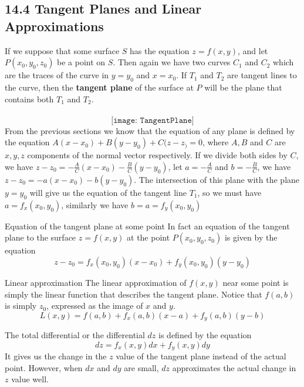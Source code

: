 \documentclass{article}
\begin{document}
	\subsection{14.4 Tangent Planes and Linear Approximations}
	If we suppose that some surface $S$ has the equation $z=f(x,y)$, and let $P(x_{0}
	,y_{0},z_{0})$ be a point on $S$. Then again we have two curves $C_{1}$ and
	$C_{2}$ which are the traces of the curve in $y=y_{0}$ and $x=x_{0}$. If $T_{1}$
	and $T_{2}$ are tangent lines to the curve, then the \textbf{tangent plane} of
	the surface at $P$ will be the plane that contains both $T_{1}$ and $T_{2}$.\\\\

	\[
		\texttt{[image: TangentPlane]}
	\]
	From the previous sections we know that the equation of any plane is defined by
	the equation $A(x-x_{0})+B(y-y_{0})+C(z-z_{)} = 0$, where $A,B$ and $C$ are
	$x,y,z$ components of the normal vector respectively. If we divide both sides by
	$C$, we have $z-z_{0} = -\frac{A}{C}(x-x_{0})-\frac{B}{C}(y-y_{0})$, let $a=-\frac{A}{C}$
	and $b= -\frac{B}{C}$, we have $z-z_{0} = -a(x-x_{0})-b(y-y_{0})$. The intersection
	of this plane with the plane $y=y_{0}$ will give us the equation of the tangent
	line $T_{1}$, so we must have $a=f_{x}(x_{0},y_{0})$, similarly we have $b=a=f_{y}
	(x_{0},y_{0})$
	\begin{mybox}
		{Equation of the tangent plane at some point} In fact an equation of the tangent
		plane to the surface $z=f(x,y)$ at the point $P(x_{0},y_{0},z_{0})$ is given
		by the equation
		\[
			z-z_{0} = f_{x}(x_{0},y_{0})(x-x_{0}) +f_{y}(x_{0},y_{0})(y-y_{0})
		\]
	\end{mybox}

	\begin{mybox}
		{Linear approximation} The linear approximation of $f(x,y)$ near some point is
		simply the linear function that describes the tangent plane. Notice that
		$f(a,b)$ is simply $z_{0}$, expressed as the image of $x$ and $y$.
		\[
			L(x,y) = f(a,b) + f_{x}(a,b)(x-a) + f_{y}(a,b)(y-b)
		\]
	\end{mybox}
	The total differential or the differential $dz$ is defined by the equation
	\[
		dz = f_{x}(x,y)dx+f_{y}(x,y)dy
	\]
	It gives us the change in the $z$ value of the tangent plane instead of the
	actual point. However, when $dx$ and $dy$ are small, $dz$ approximates the actual
	change in $z$ value well.
\end{document}
